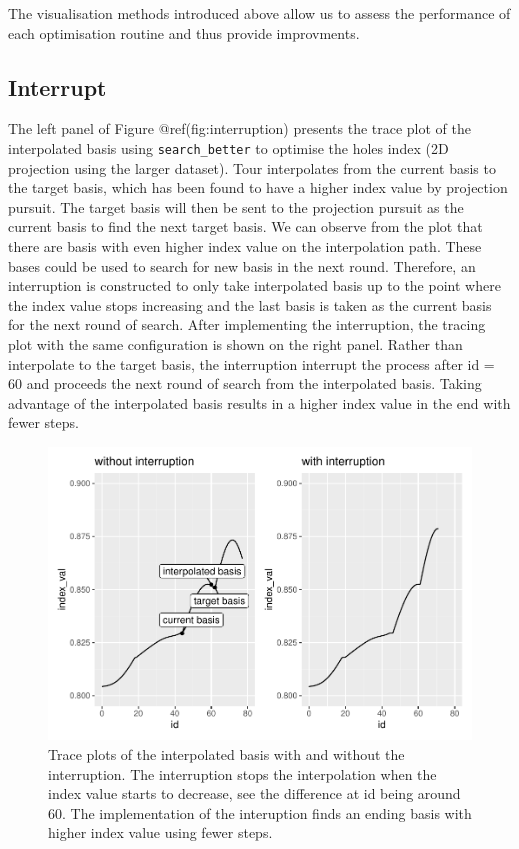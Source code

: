 \documentclass[12pt]{article}
\begin{document}
The visualisation methods introduced above allow us to assess the
performance of each optimisation routine and thus provide improvments.

\hypertarget{interrupt}{%
\subsection{Interrupt}\label{interrupt}}

The left panel of Figure @ref(fig:interruption) presents the trace plot
of the interpolated basis using \texttt{search\_better} to optimise the
holes index (2D projection using the larger dataset). Tour interpolates
from the current basis to the target basis, which has been found to have
a higher index value by projection pursuit. The target basis will then
be sent to the projection pursuit as the current basis to find the next
target basis. We can observe from the plot that there are basis with
even higher index value on the interpolation path. These bases could be
used to search for new basis in the next round. Therefore, an
interruption is constructed to only take interpolated basis up to the
point where the index value stops increasing and the last basis is taken
as the current basis for the next round of search. After implementing
the interruption, the tracing plot with the same configuration is shown
on the right panel. Rather than interpolate to the target basis, the
interruption interrupt the process after id = 60 and proceeds the next
round of search from the interpolated basis. Taking advantage of the
interpolated basis results in a higher index value in the end with fewer
steps.

\begin{figure}
\centering
\includegraphics{paper_files/figure-latex/interruption-1.pdf}
\caption{\label{interruption} Trace plots of the interpolated basis with
and without the interruption. The interruption stops the interpolation
when the index value starts to decrease, see the difference at id being
around 60. The implementation of the interuption finds an ending basis
with higher index value using fewer steps.}
\end{figure}
\end{document}
